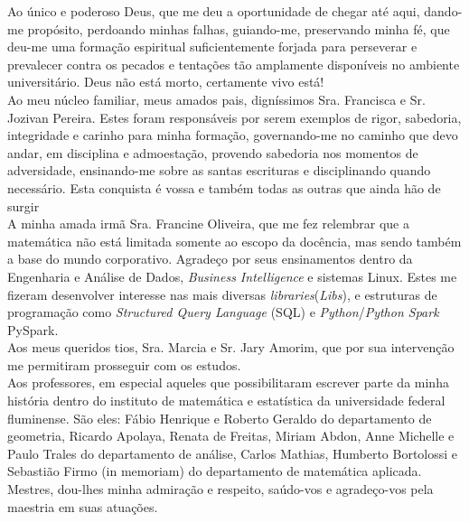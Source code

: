 
\begin{agradecimentos}
	
\noindent
Ao único e poderoso Deus, que me deu a oportunidade de chegar até aqui, dando-me propósito, perdoando minhas falhas, guiando-me, preservando minha fé, que deu-me uma formação espiritual suficientemente forjada para perseverar e prevalecer contra os pecados e tentações tão amplamente disponíveis no ambiente universitário. Deus não está morto, certamente vivo está!\\

\noindent
Ao meu núcleo familiar, meus amados pais, digníssimos Sra. Francisca e Sr. Jozivan Pereira. Estes foram responsáveis por serem exemplos de rigor, sabedoria, integridade e carinho para minha formação, governando-me no caminho que devo andar, em disciplina e admoestação, provendo sabedoria nos momentos de adversidade, ensinando-me sobre as santas escrituras e disciplinando quando necessário. Esta conquista é vossa e também todas as outras que ainda hão de surgir \heart \\

\noindent
A minha amada irmã Sra. Francine Oliveira, que me fez relembrar que a matemática não está limitada somente ao escopo da docência, mas sendo também a base do mundo corporativo. Agradeço por seus ensinamentos dentro da Engenharia e Análise de Dados, \textit{Business Intelligence} e sistemas Linux. Estes me fizeram desenvolver interesse nas mais diversas \textit{libraries}(\textit{Libs}), e estruturas de programação como \textit{Structured Query Language} (SQL) e \textit{Python}/\textit{Python Spark} {PySpark}.  \\

\noindent
Aos meus queridos tios, Sra. Marcia e Sr. Jary Amorim, que por sua intervenção me permitiram prosseguir com os estudos. \\

\noindent
Aos professores, em especial aqueles que possibilitaram escrever parte da minha história dentro do instituto de matemática e estatística da universidade federal fluminense. São eles: Fábio Henrique e Roberto Geraldo do departamento de geometria, Ricardo Apolaya, Renata de Freitas, Miriam Abdon, Anne Michelle e Paulo Trales do departamento de análise, Carlos Mathias, Humberto Bortolossi e Sebastião Firmo (in memoriam) do departamento de matemática aplicada. Mestres, dou-lhes minha admiração e respeito, saúdo-vos e agradeço-vos pela maestria em suas atuações. \\


\end{agradecimentos}
